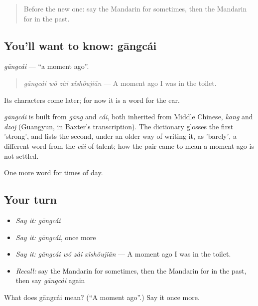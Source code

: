 \begin{quote}
Before the new one: say the Mandarin for sometimes, then the Mandarin for in the past.
\end{quote}

\subsection*{You'll want to know: gāngcái}
\emph{gāngcái} — \textquotedblleft{}a moment ago\textquotedblright{}.

\begin{quote}
\emph{gāngcái wǒ zài xǐshǒujiān} — A moment ago I was in the toilet.
\end{quote}

Its characters come later; for now it is a word for the ear.

\begin{cousinweb}
\emph{gāngcái} is built from \emph{gāng} and \emph{cái}, both inherited from Middle Chinese, \emph{kang} and \emph{dzoj} (Guangyun, in Baxter's transcription). The dictionary glosses the first 'strong', and lists the second, under an older way of writing it, as 'barely', a different word from the \emph{cái} of talent; how the pair came to mean a moment ago is not settled.
\end{cousinweb}

\begin{grammarlens}[title={What you've built}]
One more word for times of day.
\end{grammarlens}

\subsection*{Your turn}
\begin{itemize}
\raggedright
  \item \emph{Say it:} \emph{gāngcái}
  \item \emph{Say it:} \emph{gāngcái}, once more
  \item \emph{Say it:} \emph{gāngcái wǒ zài xǐshǒujiān} — A moment ago I was in the toilet.
  \item \emph{Recall:} say the Mandarin for sometimes, then the Mandarin for in the past, then say \emph{gāngcái} again
\end{itemize}

\begin{tcolorbox}[breakable,colback=teal!4,colframe=teal!35!black,title={Before you move on}]
What does gāngcái mean? (\textquotedblleft{}A moment ago\textquotedblright{}.) Say it once more.
\end{tcolorbox}
